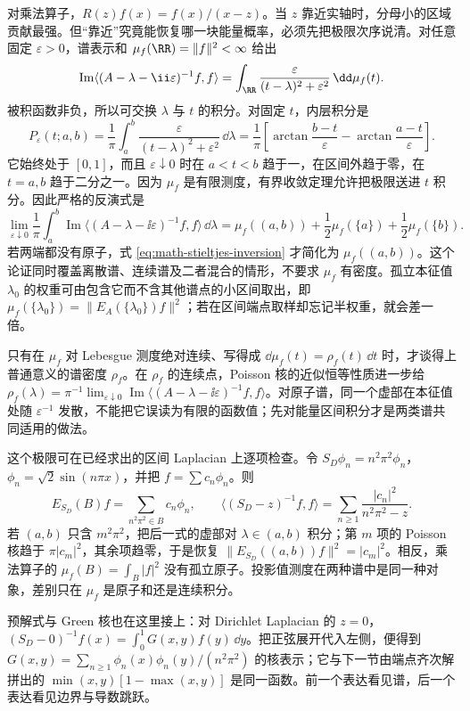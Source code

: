 对乘法算子，\(R(z)f(x)=f(x)/(x-z)\)。当 \(z\) 靠近实轴时，分母小的区域贡献最强。但“靠近”究竟能恢复哪一块能量概率，必须先把极限次序说清。对任意固定 \(\varepsilon>0\)，谱表示和 \(\mu_f(\RR)=\|f\|^2<\infty\) 给出
\[
 \operatorname{Im}\langle (A-\lambda-\ii\varepsilon)^{-1}f,f\rangle
 =\int_{\RR}\frac{\varepsilon}{(t-\lambda)^2+\varepsilon^2}\,\dd\mu_f(t).
\]
被积函数非负，所以可交换 \(\lambda\) 与 \(t\) 的积分。对固定 \(t\)，内层积分是
\[
 P_\varepsilon(t;a,b)=\frac1\pi\int_a^b
 \frac{\varepsilon}{(t-\lambda)^2+\varepsilon^2}\,\dd\lambda
 =\frac1\pi\left[\arctan\frac{b-t}{\varepsilon}
 -\arctan\frac{a-t}{\varepsilon}\right].
\]
它始终处于 \([0,1]\)，而且 \(\varepsilon\downarrow0\) 时在 \(a<t<b\) 趋于一，在区间外趋于零，在 \(t=a,b\) 趋于二分之一。因为 \(\mu_f\) 是有限测度，有界收敛定理允许把极限送进 \(t\) 积分。因此严格的反演式是
\begin{equation}
 \lim_{\varepsilon\downarrow0}\frac1\pi\int_a^b
 \operatorname{Im}\langle (A-\lambda-\ii\varepsilon)^{-1}f,f\rangle\,\dd\lambda
 =\mu_f((a,b))+\frac12\mu_f(\{a\})+\frac12\mu_f(\{b\}).
 \label{eq:math-stieltjes-inversion}
\end{equation}
若两端都没有原子，式 \cref{eq:math-stieltjes-inversion} 才简化为 \(\mu_f((a,b))\)。这个论证同时覆盖离散谱、连续谱及二者混合的情形，不要求 \(\mu_f\) 有密度。孤立本征值 \(\lambda_0\) 的权重可由包含它而不含其他谱点的小区间取出，即 \(\mu_f(\{\lambda_0\})=\|E_A(\{\lambda_0\})f\|^2\)；若在区间端点取样却忘记半权重，就会差一倍。

只有在 \(\mu_f\) 对 Lebesgue 测度绝对连续、写得成 \(\dd\mu_f(t)=\rho_f(t)\,\dd t\) 时，才谈得上普通意义的谱密度 \(\rho_f\)。在 \(\rho_f\) 的连续点，Poisson 核的近似恒等性质进一步给 \(\rho_f(\lambda)=\pi^{-1}\lim_{\varepsilon\downarrow0}\operatorname{Im}\langle (A-\lambda-\ii\varepsilon)^{-1}f,f\rangle\)。对原子谱，同一个虚部在本征值处随 \(\varepsilon^{-1}\) 发散，不能把它误读为有限的函数值；先对能量区间积分才是两类谱共同适用的做法。

这个极限可在已经求出的区间 Laplacian 上逐项检查。令 \(S_D\phi_n=n^2\pi^2\phi_n\)，\(\phi_n=\sqrt2\sin(n\pi x)\)，并把 \(f=\sum c_n\phi_n\)。则
\[
E_{S_D}(B)f=\sum_{n^2\pi^2\in B}c_n\phi_n,
\qquad
\langle (S_D-z)^{-1}f,f\rangle
=\sum_{n\ge1}\frac{|c_n|^2}{n^2\pi^2-z}.
\]
若 \((a,b)\) 只含 \(m^2\pi^2\)，把后一式的虚部对 \(\lambda\in(a,b)\) 积分；第 \(m\) 项的 Poisson 核趋于 \(\pi|c_m|^2\)，其余项趋零，于是恢复 \(\|E_{S_D}((a,b))f\|^2=|c_m|^2\)。相反，乘法算子的 \(\mu_f(B)=\int_B|f|^2\) 没有孤立原子。投影值测度在两种谱中是同一种对象，差别只在 \(\mu_f\) 是原子和还是连续积分。

预解式与 Green 核也在这里接上：对 Dirichlet Laplacian 的 \(z=0\)，\((S_D-0)^{-1}f(x)=\int_0^1G(x,y)f(y)\,\dd y\)。把正弦展开代入左侧，便得到 \(G(x,y)=\sum_{n\ge1}\phi_n(x)\phi_n(y)/(n^2\pi^2)\) 的核表示；它与下一节由端点齐次解拼出的 \(\min(x,y)[1-\max(x,y)]\) 是同一函数。前一个表达看见谱，后一个表达看见边界与导数跳跃。


